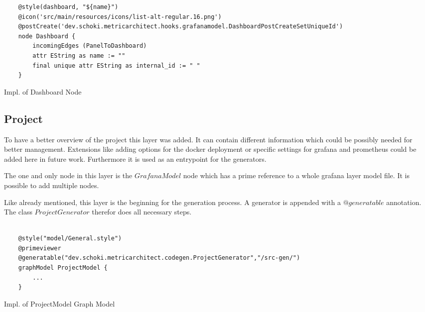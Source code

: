 \begin{listing}
	\begin{verbatim}
	@style(dashboard, "${name}")
	@icon('src/main/resources/icons/list-alt-regular.16.png')
	@postCreate('dev.schoki.metricarchitect.hooks.grafanamodel.DashboardPostCreateSetUniqueId')
	node Dashboard {
		incomingEdges (PanelToDashboard)
		attr EString as name := ""
		final unique attr EString as internal_id := " " 
	}
	\end{verbatim}
	\caption{Impl. of Dashboard Node}
	\label{lst:nodeDashboard}
\end{listing}
\subsection{Project}
To have a better overview of the project this layer was added. It can contain different information which could be possibly needed for better management. Extensions like adding options for the docker deployment or specific settings for grafana and prometheus could be added here in future work. Furthermore it is used as an entrypoint for the generators. 

The one and only node in this layer is the $GrafanaModel$ node which has a prime reference to a whole grafana layer model file. It is possible to add multiple nodes.

Like already mentioned, this layer is the beginning for the generation process. A generator is appended with a $@generatable$ annotation. The class $ProjectGenerator$ therefor does all necessary steps. 

\begin{listing}[H]
	\begin{verbatim}
	
	@style("model/General.style")
	@primeviewer
	@generatable("dev.schoki.metricarchitect.codegen.ProjectGenerator","/src-gen/")
	graphModel ProjectModel {
		...
	}
	\end{verbatim}
	\caption{Impl. of ProjectModel Graph Model}
	\label{lst:modelProjectModel}
\end{listing}

